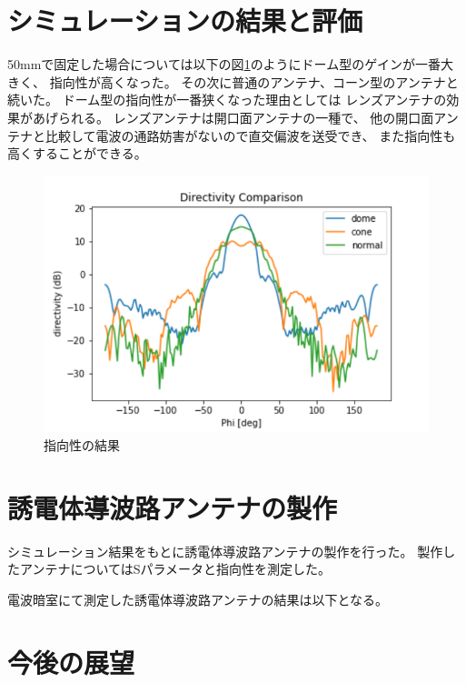 \documentclass[technicalreport]{ieicej}
\begin{document}
\section{シミュレーションの結果と評価}

50mmで固定した場合については以下の図\ref{fig:directivity_results}のようにドーム型のゲインが一番大きく、
指向性が高くなった。
その次に普通のアンテナ、コーン型のアンテナと続いた。
ドーム型の指向性が一番狭くなった理由としては
レンズアンテナの効果があげられる。
レンズアンテナは開口面アンテナの一種で、
他の開口面アンテナと比較して電波の通路妨害がないので直交偏波を送受でき、
また指向性も高くすることができる。


\begin{figure}[tb]
  \begin{center}
    \includegraphics[bb=0 0 324 216, width=1.0\linewidth]{img/directivity.pdf}
    \caption{指向性の結果}
    \label{fig:directivity_results}
  \end{center}
\end{figure}


\section{誘電体導波路アンテナの製作}

シミュレーション結果をもとに誘電体導波路アンテナの製作を行った。
製作したアンテナについてはSパラメータと指向性を測定した。

電波暗室にて測定した誘電体導波路アンテナの結果は以下となる。

\section{今後の展望}
\end{document}
